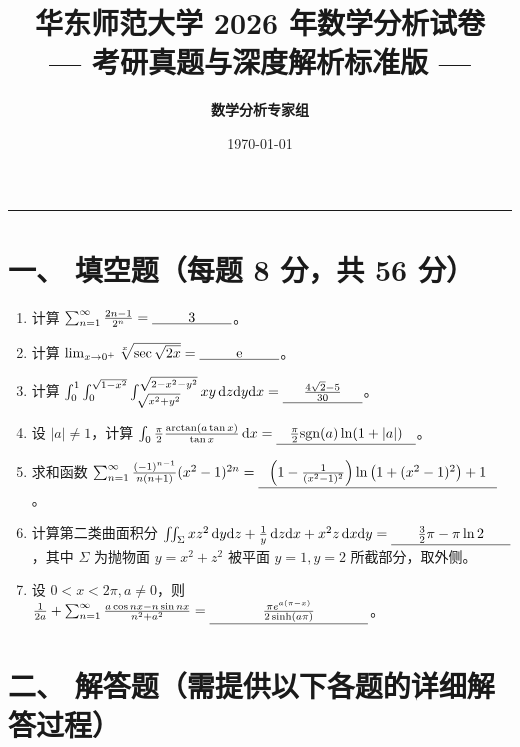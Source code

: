 \documentclass[11pt,a4paper]{article}
\title{\vspace{-1cm}\Huge\textbf{华东师范大学 2026 年数学分析试卷}\\[0.3em]\large --- 考研真题与深度解析标准版 ---}
\author{\textbf{数学分析专家组}}
\date{\today}
\newcommand{\dd}{\mathrm{d}}
\begin{document}
	
	\maketitle
	
	\begin{center}
		\rule{\textwidth}{0.8pt}
	\end{center}
	
	\section{一、 填空题（每题 8 分，共 56 分）}
	
	\begin{enumerate}
		\item 计算 $\sum_{n=1}^\infty \frac{2n - 1}{2^n} = \underline{\makebox[2cm]{3}}$。
		
		\item 计算 $\lim_{x \to 0^+} \sqrt[x]{\sec \sqrt{2x}} = \underline{\makebox[2cm]{e}}$。
		
		\item 计算 $\int_0^1 \int_0^{\sqrt{1-x^2}} \int_{\sqrt{x^2+y^2}}^{\sqrt{2-x^2-y^2}} xy \,\dd z\dd y\dd x = \underline{\makebox[2cm]{$\frac{4\sqrt{2}-5}{30}$}}$。
		
		\item 设 $|a| \neq 1$，计算 $\int_0{\frac{\pi}{2}} \frac{\arctan(a \tan x)}{\tan x} \,\dd x = \underline{\makebox[3.5cm]{$\frac{\pi}{2} \text{sgn}(a) \ln(1+|a|)$}}$。
		
		\item 求和函数 $\sum_{n=1}^\infty \frac{(-1)^{n-1}}{n(n+1)}(x^2 - 1)^{2n} = \underline{\makebox[6cm]{$\left(1 - \frac{1}{(x^2-1)^2}\right)\ln\left(1+(x^2-1)^2\right) + 1$}}$。
		
		\item 计算第二类曲面积分 $\iint_\Sigma xz^2 \,\dd y\dd z + \frac{1}{y} \,\dd z\dd x + x^2z \,\dd x\dd y = \underline{\makebox[3cm]{$\frac{3}{2}\pi - \pi\ln 2$}}$，其中 $\Sigma$ 为抛物面 $y = x^2+z^2$ 被平面 $y=1, y=2$ 所截部分，取外侧。
		
		\item 设 $0 < x < 2\pi, a \neq 0$，则 $\frac{1}{2a} + \sum_{n=1}^\infty \frac{a \cos nx - n \sin nx}{n^2 + a^2} = \underline{\makebox[4cm]{$\frac{\pi e^{a(\pi-x)}}{2\sinh(a\pi)}$}}$。
	\end{enumerate}
	
	\newpage
	\section{二、 解答题（需提供以下各题的详细解答过程）}
	
\end{document}
